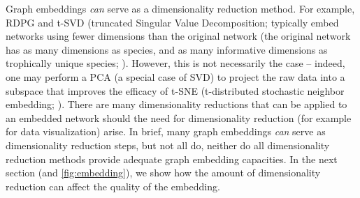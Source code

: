 Graph embeddings \emph{can} serve as a dimensionality reduction method.
For example, RDPG \cite{Strydom2022Food} and t-SVD (truncated Singular
Value Decomposition; \cite{Poisot2021Imputing} typically embed networks
using fewer dimensions than the original network (the original network
has as many dimensions as species, and as many informative dimensions as
trophically unique species; \cite{Strydom2021Svd}). However, this is not
necessarily the case -- indeed, one may perform a PCA (a special case of
SVD) to project the raw data into a subspace that improves the efficacy
of t-SNE (t-distributed stochastic neighbor embedding;
\cite{Maaten2009Learning}). There are many dimensionality reductions
\cite{Anowar2021Conceptual} that can be applied to an embedded network
should the need for dimensionality reduction (for example for data
visualization) arise. In brief, many graph embeddings \emph{can} serve
as dimensionality reduction steps, but not all do, neither do all
dimensionality reduction methods provide adequate graph embedding
capacities. In the next section (and \autoref{fig:embedding}), we show how the
amount of dimensionality reduction can affect the quality of the
embedding.

